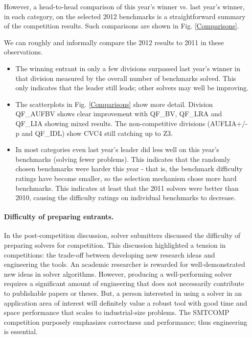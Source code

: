 \documentclass[twosize,11pt]{article}
\begin{document}
However, a head-to-head comparison of this year's winner vs. last year's winner, in each category, on the selected 2012 benchmarks is a straightforward summary of the competition results. Such comparisons are shown in Fig. \ref{Comparisons}.

We can roughly and informally compare the 2012 results to 2011 in these observations.
\begin{itemize}
\item The winning entrant in only a few divisions surpassed last year's winner in that division measured by the overall number of benchmarks solved. This only indicates that the leader still leads; other solvers may well be improving.
\item The scatterplots in Fig. \ref{Comparisons} show more detail. Division QF\_AUFBV shows clear improvement with QF\_BV, QF\_LRA and QF\_LIA showing mixed results. The non-competitive divisions (AUFLIA+/-p and QF\_IDL) show CVC4 still catching up to Z3.
\item In most categories even last year's leader did less well on this year's benchmarks (solving fewer problems). This indicates that the randomly chosen benchmarks were harder this year - that is, the benchmark difficulty ratings have become smaller, so the selection mechanism chose more hard benchmarks. This indicates at least that the 2011 solvers were better than 2010, causing the difficulty ratings on individual benchmarks to decrease.
\end{itemize}

\paragraph{Difficulty of preparing entrants.} In the post-competition discussion, solver submitters discussed the difficulty of preparing solvers for competition. This discussion highlighted a tension in competitions: the trade-off between developing new research ideas and engineering the tools. An academic researcher is rewarded for well-demonstrated new ideas in solver algorithms. However, producing a well-performing solver requires a significant amount of engineering that does not necessarily contribute to publishable papers or theses. 
But, a person interested in using a solver in an application area of interest will definitely value a robust tool with good time and space performance that scales to industrial-size problems. The SMTCOMP competition purposely emphasizes correctness and performance; thus engineering is essential.
\end{document}
